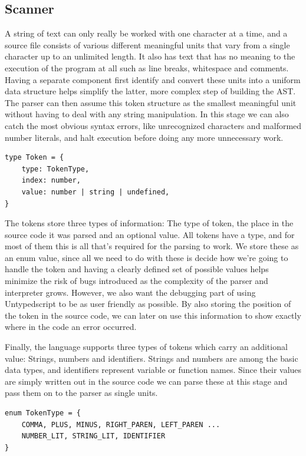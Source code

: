 \documentclass[12pt,a4paper]{article}
\begin{document}
\subsection{Scanner}
A string of text can only really be worked with one character at a time, and a source file consists of various different meaningful units that vary from a single character up to an unlimited length. 
It also has text that has no meaning to the execution of the program at all such as line breaks, whitespace and comments. 
Having a separate component first identify and convert these units into a uniform data structure helps simplify the latter, more complex step of building the AST. The parser can then assume this token structure as the smallest meaningful unit without having to deal with any string manipulation. In this stage we can also catch the most obvious syntax errors, like unrecognized characters and malformed number literals, and halt execution before doing any more unnecessary work.

\begin{lstlisting}[title = Token structure]
type Token = {
    type: TokenType,
    index: number,
    value: number | string | undefined,
}
\end{lstlisting}

The tokens store three types of information: The type of token, the place in the source code it was parsed and an optional value. All tokens have a type, and for most of them this is all that's required for the parsing to work. We store these as an enum value, since all we need to do with these is decide how we're going to handle the token and having a clearly defined set of possible values helps minimize the risk of bugs introduced as the complexity of the parser and interpreter grows.
However, we also want the debugging part of using Untypedscript to be as user friendly as possible. By also storing the position of the token in the source code, we can later on use this information to show exactly where in the code an error occurred.

Finally, the language supports three types of tokens which carry an additional value: Strings, numbers and identifiers. Strings and numbers are among the basic data types, and identifiers represent variable or function names. Since their values are simply written out in the source code we can parse these at this stage and pass them on to the parser as single units.

\begin{lstlisting}[title = Example of token types]
enum TokenType = {
    COMMA, PLUS, MINUS, RIGHT_PAREN, LEFT_PAREN ...
    NUMBER_LIT, STRING_LIT, IDENTIFIER
}
\end{lstlisting}
\end{document}
